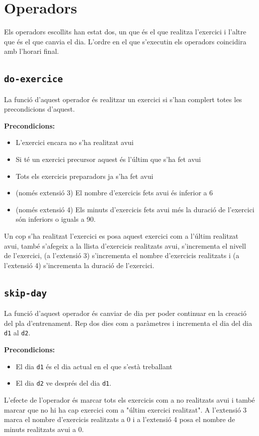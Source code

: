 \documentclass[a4paper,12pt, UTF-8]{article}
\begin{document}
\section{Operadors}

Els operadors escollits han estat dos, un que és el que realitza l'exercici i l'altre que és el que canvia el dia. L'ordre en el que s'executin els operadors coincidira amb l'horari final.

\subsection{\texttt{do-exercice}}

La funció d'aquest operador és realitzar un exercici si s'han complert totes les precondicions d'aquest.

\textbf{Precondicions: } 
\begin{itemize}
	\item L'exercici encara no s'ha realitzat avui
	\item Si té un exercici precursor aquest és l'últim que s'ha fet avui
	\item Tots els exercicis preparadors ja s'ha fet avui
	\item (només extensió 3) El nombre d'exercicis fets avui és inferior a 6
	\item (només extensió 4) Els minuts d'exercicis fets avui més la duració de l'exercici són inferiors o iguals a 90.
\end{itemize}

Un cop s'ha realitzat l'exercici es posa aquest exercici com a l'últim realitzat avui, també s'afegeix a la llista d'exercicis realitzats avui, s'incrementa el nivell de l'exercici, (a l'extensió 3) s'incrementa el nombre d'exercicis realitzats i (a l'extensió 4) s'incrementa la duració de l'exercici.

\subsection{\texttt{skip-day}}

La funció d'aquest operador és canviar de dia per poder continuar en la creació del pla d'entrenament. Rep dos dies com a paràmetres i incrementa el dia del dia \verb|d1| al \verb|d2|.

\textbf{Precondicions: }
\begin{itemize}
	\item El dia \verb|d1| és el dia actual en el que s'està treballant
	\item El dia \verb|d2| ve després del dia \verb|d1|.
\end{itemize}

L'efecte de l'operador és marcar tots els exercicis com a no realitzats avui i també marcar que no hi ha cap exercici com a "últim exercici realitzat". A l'extensió 3 marca el nombre d'exercicis realitzats a 0 i a l'extensió 4 posa el nombre de minuts realitzats avui a 0.
\end{document}

